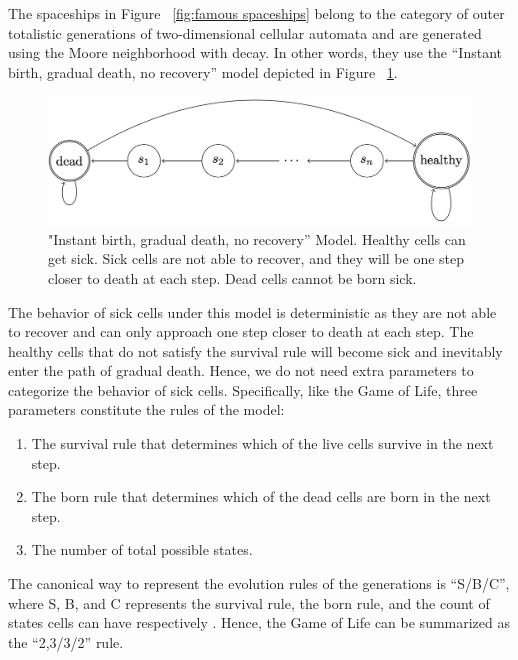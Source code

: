 \documentclass[12pt]{article}
\numberwithin{figure}{section} %
\begin{document}
The spaceships in Figure ~\ref{fig:famous spaceships} belong to the category of outer totalistic generations of two-dimensional cellular automata and are generated using the Moore neighborhood with decay. In other words, they use the “Instant birth, gradual death, no recovery” model depicted in Figure ~\ref{fig:IGN model}. 

\begin{figure}[H]
	\centering
	\includegraphics[width=\linewidth]{Section1/9}
	\caption[“Instant birth, gradual death, no recovery” Model]{"Instant birth, gradual death, no recovery” Model. Healthy cells can get sick. Sick cells are not able to recover, and they will be one step closer to death at each step. Dead cells cannot be born sick.}
	\label{fig:IGN model}
	\vspace{-1.5em}
\end{figure}

The behavior of sick cells under this model is deterministic as they are not able to recover and can only approach one step closer to death at each step. The healthy cells that do not satisfy the survival rule will become sick and inevitably enter the path of gradual death. Hence, we do not need extra parameters to categorize the behavior of sick cells. Specifically, like the Game of Life,  three parameters constitute the rules of the model: 
\begin{enumerate}[topsep=0pt,itemsep=-1ex,partopsep=1ex,parsep=1ex]
\item The survival rule that determines which of the live cells survive in the next step. 
\item The born rule that determines which of the dead cells are born in the next step. 
\item The number of total possible states. 
\end{enumerate}
The canonical way to represent the evolution rules of the generations is “S/B/C”, where S, B, and C represents the survival rule, the born rule, and the count of states cells can have respectively \cite{Lexicon}. Hence, the Game of Life can be summarized as the “2,3/3/2” rule.
\end{document}
